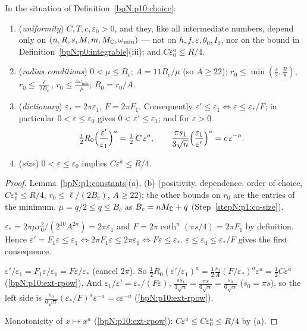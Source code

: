 \begin{lemma}\label{bpN:p10:choice-props}
In the situation of Definition~\ref{bpN:p10:choice}:
\begin{enumerate}[label=(\alph*)]
\item (\emph{uniformity}) $C,T,c,\varepsilon_0>0$, and they, like all intermediate numbers, depend only on $(n,R,s,M,m,M_{\mathbb{C}},\omega_{\min})$ --- not on $h,f,\varepsilon,\theta_0,I_0$, nor on the bound in Definition~\ref{bpN:p0:integrable}(iii); and $C\varepsilon_0^a\le R/4$.
\item (\emph{radius conditions}) $0<\mu\le B_c$; $A=11B_c/\mu$ (so $A\ge22$); $r_0\le\min(\frac s2,\frac R8)$, $r_0\le\frac\ell{2B_c}$, $r_0\le\frac{4\omega_{\min}}\mu$; $R_0=r_0/A$.
\item (\emph{dictionary}) $\varepsilon_*=2\pi\varepsilon_1$, $F=2\pi F_1$. Consequently $\varepsilon'\le\varepsilon_1\iff\varepsilon\le\varepsilon_*/F$; in particular $0<\varepsilon\le\varepsilon_0$ gives $0<\varepsilon'\le\varepsilon_1$; and for $\varepsilon>0$
\[\tfrac12R_0\Bigl(\frac{\varepsilon'}{\varepsilon_1}\Bigr)^a=\tfrac12\,C\,\varepsilon^a,\qquad \frac{\pi s_1}{3\sqrt n}\Bigl(\frac{\varepsilon_1}{\varepsilon'}\Bigr)^a=c\,\varepsilon^{-a}.\]
\item (\emph{size}) $0<\varepsilon\le\varepsilon_0$ implies $C\varepsilon^a\le R/4$.
\end{enumerate}
\end{lemma}
\begin{proof}
\label{stepN:p10:cp-ab} Lemma~\ref{bpN:p1:constants}(a), (b) (positivity, dependence, order of choice, $C\varepsilon_0^a\le R/4$, $r_0\le\ell/(2B_c)$, $A\ge22$); the other bounds on $r_0$ are the entries of the minimum. $\mu=q/2\le q\le B_c$ as $B_c=nM_{\mathbb{C}}+q$ (Step~\ref{stepN:p1:co-size}).

\label{stepN:p10:cp-dict} $\varepsilon_*=2\pi\mu r_0^2/(2^{10}A^{2n})=2\pi\varepsilon_1$ and $F=2\pi\coth^n(\pi s/4)=2\pi F_1$ by definition. Hence $\varepsilon'=F_1\varepsilon\le\varepsilon_1\iff2\pi F_1\varepsilon\le2\pi\varepsilon_1\iff F\varepsilon\le\varepsilon_*$. $\varepsilon\le\varepsilon_0\le\varepsilon_*/F$ gives the first consequence.

\label{stepN:p10:cp-rad} $\varepsilon'/\varepsilon_1=F_1\varepsilon/\varepsilon_1=F\varepsilon/\varepsilon_*$ (cancel $2\pi$). So $\frac12R_0(\varepsilon'/\varepsilon_1)^a=\frac12\frac{r_0}A(F/\varepsilon_*)^a\varepsilon^a=\frac12C\varepsilon^a$ (\ref{bpN:p10:ext-rpow}). And $\varepsilon_1/\varepsilon'=\varepsilon_*/(F\varepsilon)$, $\frac{\pi s_1}{3\sqrt n}=\frac{\pi s}{6\sqrt n}=\frac{s_0}{6\sqrt n}$ ($s_0=\pi s$), so the left side is $\frac{s_0}{6\sqrt n}(\varepsilon_*/F)^a\varepsilon^{-a}=c\varepsilon^{-a}$ (\ref{bpN:p10:ext-rpow}).

\label{stepN:p10:cp-size} Monotonicity of $x\mapsto x^a$ (\ref{bpN:p10:ext-rpow}): $C\varepsilon^a\le C\varepsilon_0^a\le R/4$ by (a).
\end{proof}

